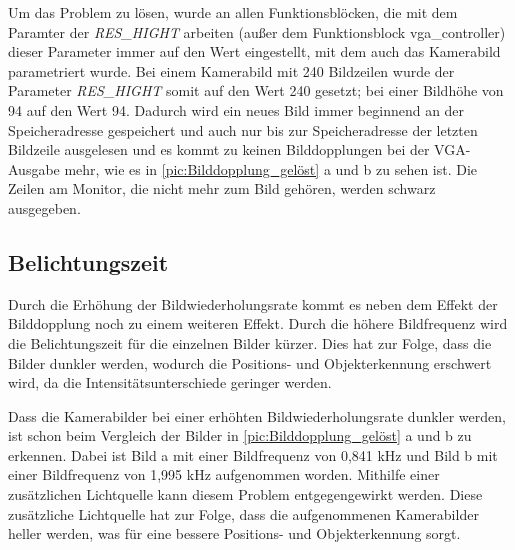 \documentclass[ngerman,12pt]{article} %
\begin{document}
{Um das Problem zu lösen, wurde an allen Funktionsblöcken, die mit dem Paramter der \textit{RES\_HIGHT} arbeiten (außer dem Funktionsblock vga\_controller) dieser Parameter immer auf den Wert eingestellt, mit dem auch das Kamerabild parametriert wurde. Bei einem Kamerabild mit 240 Bildzeilen wurde der Parameter \textit{RES\_HIGHT} somit auf den Wert 240 gesetzt; bei einer Bildhöhe von 94 auf den Wert 94. Dadurch wird ein neues Bild immer beginnend an der Speicheradresse gespeichert und auch nur bis zur Speicheradresse der letzten Bildzeile ausgelesen und es kommt zu keinen Bilddopplungen bei der VGA-Ausgabe mehr, wie es in \autoref{pic:Bilddopplung_gelöst} a und b zu sehen ist. Die Zeilen am Monitor, die nicht mehr zum Bild gehören, werden schwarz ausgegeben.\\



\subsection{Belichtungszeit}
\label{sec:Belichtungszeit}
Durch die Erhöhung der Bildwiederholungsrate kommt es neben dem Effekt der Bilddopplung noch zu einem weiteren Effekt. Durch die höhere Bildfrequenz wird die Belichtungszeit für die einzelnen Bilder kürzer. Dies hat zur Folge, dass die Bilder dunkler werden, wodurch die Positions- und Objekterkennung erschwert wird, da die Intensitätsunterschiede geringer werden.\newline

Dass die Kamerabilder bei einer erhöhten Bildwiederholungsrate dunkler werden, ist schon beim Vergleich der Bilder in \autoref{pic:Bilddopplung_gelöst} a und b zu erkennen. Dabei ist Bild a mit einer Bildfrequenz von 0,841 kHz und Bild b mit einer Bildfrequenz von 1,995 kHz  aufgenommen worden.  Mithilfe einer zusätzlichen Lichtquelle kann diesem Problem entgegengewirkt werden. Diese zusätzliche Lichtquelle hat zur Folge, dass die aufgenommenen Kamerabilder heller werden, was für eine bessere Positions- und Objekterkennung sorgt.\\
\clearpage




}
\end{document}
